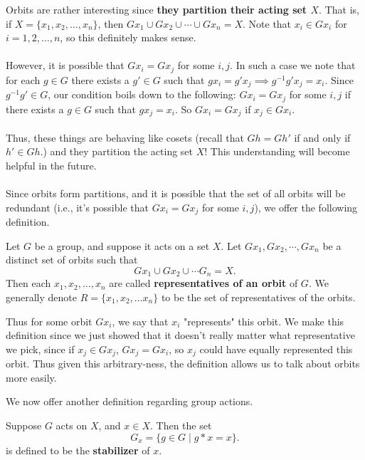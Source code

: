     \textcolor{NavyBlue}{Orbits are rather interesting since \textbf{they partition their acting
    set $X$}. That is, if $X = \{x_1, x_2, \dots, x_n\}$, then 
    $Gx_1 \cup Gx_2 \cup \cdots \cup Gx_n = X$. Note that $x_i \in
    Gx_i$ for $i = 1, 2, \dots, n$, so this definitely makes sense.
    \\
    \\
    However, it is possible that $Gx_i = Gx_j$ for some $i, j.$ In
    such a case we note that for each $g \in G$ there exists a $g' \in
    G$ such that $gx_i = g'x_j \implies g^{-1}g'x_j = x_i$. Since
    $g^{-1}g' \in G$, 
    our condition boils down to the following: 
    $Gx_i = Gx_j$ for some $i, j$ if there exists a $g \in G$
    such that 
    $gx_j = x_i$. So $Gx_i = Gx_j$ if $x_j \in Gx_i$.}
    \\
    \\
    Thus, these things are behaving like cosets (recall that $Gh =
    Gh'$ if and only if $h' \in Gh$.) and they partition the acting
    set $X$! This understanding will become helpful in the future. 
    \\
    \\
    Since orbits form partitions, and it is possible that the set of
    all orbits will be redundant (i.e., it's possible that $Gx_i =
    Gx_j$ for some $i, j$), we offer the following definition.

    \begin{definition}
        Let $G$ be a group, and suppose it acts on a set $X$. 
        Let $Gx_1, Gx_2, \cdots, Gx_n$ be a distinct set of
        orbits  such that 
        \[
            Gx_1 \cup Gx_2 \cup \cdots G_n = X.
        \]
        Then each $x_1, x_2, \dots, x_n$ are called
        \textbf{representatives of an orbit} of $G$. We generally
        denote $R = \{x_1, x_2, \dots x_n\}$ to be the set of
        representatives of the orbits. 
    \end{definition}

    Thus for some orbit $Gx_i$, we say that $x_i$ "represents" this
    orbit. We make this definition since we just showed that 
    it doesn't really matter what representative we pick, since if 
    $x_j \in Gx_j$, $Gx_j = Gx_i$, so $x_j$ could have equally
    represented this orbit. Thus given this arbitrary-ness, the
    definition allows us to talk about orbits more easily.
    
    We now offer another definition regarding group actions.

    \begin{definition}
        Suppose $G$ acts on $X$, and $x \in X$. Then the set 
        \[
            G_x = \{g \in G \mid g * x = x\}.
        \]
        is defined to be the \textbf{stabilizer} of $x$.
    \end{definition}
    
